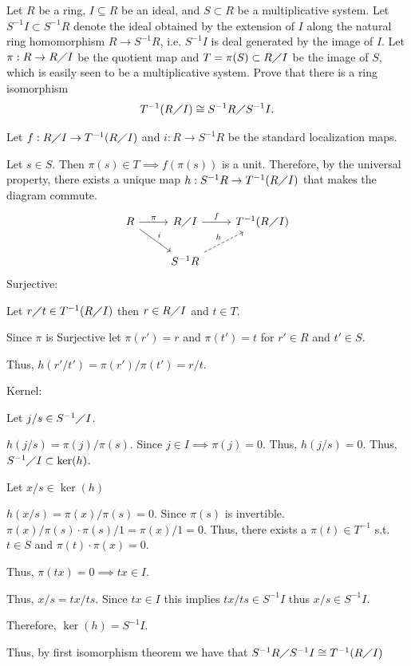 \documentclass[12pt, letterpaper]{article}
\begin{document}
\qh
\begin{subproblem}{}
    Let $R$ be a ring, $I \subseteq R$ be an ideal, and $S \subset R$ be a multiplicative system.
    Let $S^{-1}I \subset S^{-1}R$ denote the ideal obtained by the extension of $I$ along the natural ring
    homomorphism $R \to S^{-1}R$, i.e. $S^{-1}I$ is deal generated by the image of $I$. Let $\pi: R \to R \diagup I$ 
    be the quotient map and $T=\pi(S) \subset R \diagup I$ be the image of $S$, which is easily 
    seen to be a multiplicative system. Prove that there is a ring isomorphism
    \[T^{-1}(R \diagup I) \cong S^{-1}R \diagup S^{-1}I.\]
\end{subproblem}
\begin{problemproof}
    Let $f : R \diagup I \to T^{-1}(R \diagup I)$ and $i : R \to S^{-1}R$ be the standard localization maps.

    Let $s \in S$. Then $\pi(s) \in T \implies f(\pi(s))$ is a unit. Therefore, by the universal property, there exists a unique map $h : S^{-1}R \to T^{-1}(R \diagup I)$ that makes the diagram commute.
    \[\begin{tikzcd}
	R & {R \diagup I} & {T^{-1}(R \diagup I)} \\
	& {S^{-1}R}
	\arrow["\pi", from=1-1, to=1-2]
	\arrow["i", from=1-1, to=2-2]
	\arrow["f", from=1-2, to=1-3]
	\arrow["h", dashed, from=2-2, to=1-3]
    \end{tikzcd}\]
    Surjective:

    Let $r \diagup t \in T^{-1}(R \diagup I)$ then $r \in R \diagup I$ and $t \in T$.

    Since $\pi$ is Surjective let $\pi(r')=r$ and $\pi(t')=t$ for  $r' \in R$ and $t' \in S$.

    Thus, $h(r'/t')=\pi(r')/\pi(t')=r/t$.

    Kernel:

    Let $j/s \in S^{-1}\diagup I$.

    $h(j/s)=\pi(j)/\pi(s)$. Since $j \in I \implies \pi(j)=0$. Thus, $h(j/s)=0$. Thus, $S^{-1} \diagup I \subset \ker(h)$.

    Let $x/s \in \ker(h)$

    $h(x/s)=\pi(x)/\pi(s)=0$. Since $\pi(s)$ is invertible. $\pi(x)/\pi(s) \cdot \pi(s)/1=\pi(x)/1=0$. Thus, there exists a $\pi(t) \in T^{-1}$ s.t. $t \in S$ and $\pi(t) \cdot \pi(x) = 0$.

    Thus, $\pi(tx)=0 \implies tx \in I$.

    Thus, $x/s=tx/ts$. Since $tx \in I$ this implies $tx/ts \in S^{-1}I$ thus $x/s \in S^{-1}I$.

    Therefore, $\ker(h)=S^{-1}I$.

    Thus, by first isomorphism theorem we have that $S^{-1}R \diagup S^{-1}I \cong T^{-1}(R \diagup I)$
\end{problemproof}
\end{document}
